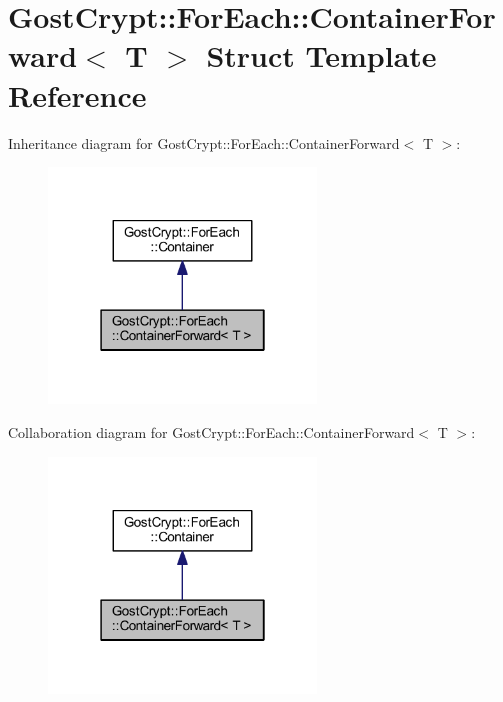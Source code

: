 \hypertarget{struct_gost_crypt_1_1_for_each_1_1_container_forward}{}\section{Gost\+Crypt\+:\+:For\+Each\+:\+:Container\+Forward$<$ T $>$ Struct Template Reference}
\label{struct_gost_crypt_1_1_for_each_1_1_container_forward}


Inheritance diagram for Gost\+Crypt\+:\+:For\+Each\+:\+:Container\+Forward$<$ T $>$\+:
\nopagebreak
\begin{figure}[H]
\begin{center}
\leavevmode
\includegraphics[width=202pt]{struct_gost_crypt_1_1_for_each_1_1_container_forward__inherit__graph}
\end{center}
\end{figure}


Collaboration diagram for Gost\+Crypt\+:\+:For\+Each\+:\+:Container\+Forward$<$ T $>$\+:
\nopagebreak
\begin{figure}[H]
\begin{center}
\leavevmode
\includegraphics[width=202pt]{struct_gost_crypt_1_1_for_each_1_1_container_forward__coll__graph}
\end{center}
\end{figure}
